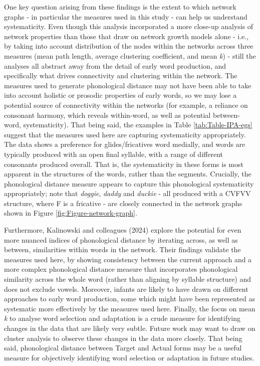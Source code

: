\documentclass[
  man]{apa6}
\begin{document}
One key question arising from these findings is the extent to which network graphs - in particular the measures used in this study - can help us understand systematicity. Even though this analysis incorporated a more close-up analysis of network properties than those that draw on network growth models alone - i.e., by taking into account distribution of the nodes within the networks across three measures (mean path length, average clustering coefficient, and mean \emph{k}) - still the analyses all abstract away from the detail of early word production, and specifically what drives connectivity and clustering within the network. The measures used to generate phonological distance may not have been able to take into account holistic or prosodic properties of early words, so we may lose a potential source of connectivity within the networks (for example, a reliance on consonant harmony, which reveals within-word, as well as potential between-word, systematicity). That being said, the examples in Table \ref{tab:Table-IPA-egs} suggest that the measures used here are capturing systematicity appropriately. The data shows a preference for glides/fricatives word medially, and words are typically produced with an open final syllable, with a range of different consonants produced overall. That is, the systematicity in these forms is most apparent in the structures of the words, rather than the segments. Crucially, the phonological distance measure appears to capture this phonological systematicity appropriately; note that \emph{doggie}, \emph{daddy} and \emph{duckie} - all produced with a CVFVV structure, where F is a fricative - are closely connected in the network graphs shown in Figure \ref{fig:Figure-network-graph}.

Furthermore, Kalinowski and colleagues (2024) explore the potential for even more nuanced indices of phonological distance by iterating across, as well as between, similarities within words in the network. Their findings validate the measures used here, by showing consistency between the current approach and a more complex phonological distance measure that incorporates phonological similarity across the whole word (rather than aligning by syllable structure) and does not exclude vowels. Moreover, infants are likely to have drawn on different approaches to early word production, some which might have been represented as systematic more effectively by the measures used here. Finally, the focus on mean \emph{k} to analyse word selection and adaptation is a crude measure for identifying changes in the data that are likely very subtle. Future work may want to draw on cluster analysis to observe these changes in the data more closely. That being said, phonological distance between Target and Actual forms may be a useful measure for objectively identifying word selection or adaptation in future studies.
\end{document}

